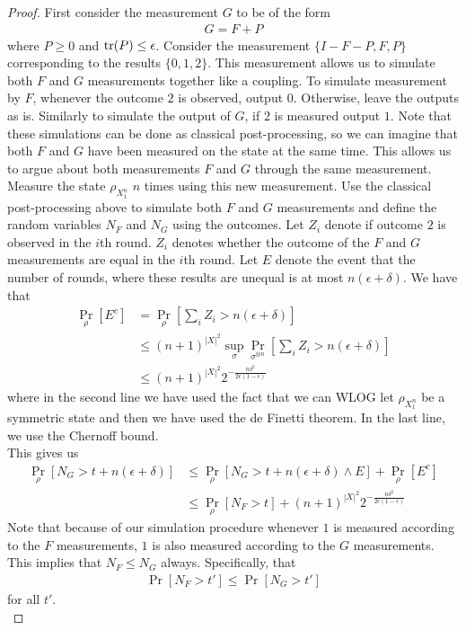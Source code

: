 \documentclass[11pt, oneside]{article}   	%
\begin{document}
\begin{proof}
    First consider the measurement $G$ to be of the form 
    \begin{align}
        G = F + P
    \end{align}
    where $P \geq 0$ and $\operatorname{tr}(P)\leq \epsilon$. Consider the measurement $\{I - F - P, F, P\}$ corresponding to the results $\{0, 1, 2\}$. This measurement allows us to simulate both $F$ and $G$ measurements together like a coupling. To simulate measurement by $F$, whenever the outcome $2$ is observed, output $0$. Otherwise, leave the outputs as is. Similarly to simulate the output of $G$, if $2$ is measured output $1$. Note that these simulations can be done as classical post-processing, so we can imagine that both $F$ and $G$ have been measured on the state at the same time. This allows us to argue about both measurements $F$ and $G$ through the same measurement.\\
    
    Measure the state $\rho_{X_1^n}$ $n$ times using this new measurement. Use the classical post-processing above to simulate both $F$ and $G$ measurements and define the random variables $N_F$ and $N_G$ using the outcomes. Let $Z_i$ denote if outcome $2$ is observed in the $i$th round. $Z_i$ denotes whether the outcome of the $F$ and $G$ measurements are equal in the $i$th round. Let $E$ denote the event that the number of rounds, where these results are unequal is at most $n(\epsilon+\delta)$. We have that 
    \begin{align*}
        \Pr_{\rho}[E^c] &= \Pr_{\rho}[\sum_i Z_i > n(\epsilon+\delta)] \\
        & \leq (n+1)^{|X|^2} \sup_{\sigma} \Pr_{\sigma^{\otimes n}} [\sum_i Z_i > n(\epsilon+\delta)] \\
        &\leq (n+1)^{|X|^2} 2^{- \frac{n \delta^2}{2\epsilon(1- \epsilon)}}
    \end{align*}
    where in the second line we have used the fact that we can WLOG let $\rho_{X_1^n}$ be a symmetric state and then we have used the de Finetti theorem. In the last line, we use the Chernoff bound. \\

    This gives us
    \begin{align}
        \Pr_\rho[N_G > t + n(\epsilon+\delta)] &\leq \Pr_\rho[N_G > t + n(\epsilon+\delta) \wedge E] + \Pr_{\rho}[E^c] \\
        &\leq \Pr_\rho[N_F > t ] + (n+1)^{|X|^2} 2^{- \frac{n \delta^2}{2\epsilon(1- \epsilon)}}
        \label{eq:Ng_leq_Nf}
    \end{align}
    Note that because of our simulation procedure whenever $1$ is measured according to the $F$ measurements, $1$ is also measured according to the $G$ measurements. This implies that $N_F \leq N_G$ always. Specifically, that 
    \begin{align}
        \Pr[N_F > t'] \leq \Pr[N_G > t'] 
        \label{eq:Nf_leq_Ng}
    \end{align}
    for all $t'$.\\


\end{proof}
\end{document}
